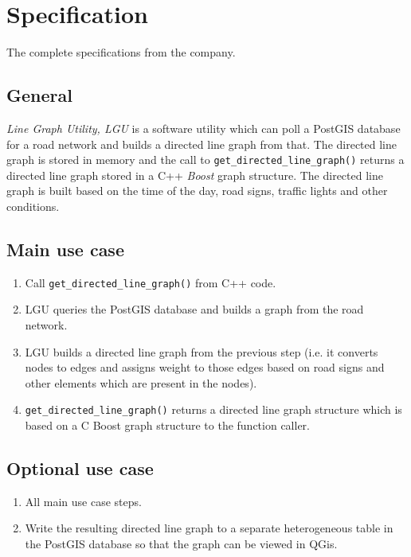 \documentclass[../main.tex]{subfiles}
\begin{document}
\chapter{Specification}\label{appendix-specification}
The complete specifications from the company.

\section{General}
\textit{Line Graph Utility, LGU} is a software utility which can poll a PostGIS database for a road network and builds a directed line graph from that. The directed line graph is stored in memory and the call to \texttt{get\_directed\_line\_graph()} returns a directed line graph stored in a C++ \textit{Boost} graph structure. The directed line graph is built based on the time of the day, road signs, traffic lights and other conditions.

\section{Main use case}
\begin{enumerate}[\thesection .1]
    \item Call \texttt{get\_directed\_line\_graph()} from C++ code.
    \item LGU queries the PostGIS database and builds a graph from the road network.
    \item LGU builds a directed line graph from the previous step (i.e. it converts nodes to edges and assigns weight to those edges based on road signs and other elements which are present in the nodes).
    \item \texttt{get\_directed\_line\_graph()} returns a directed line graph structure which is based on a C Boost graph structure to the function caller.
\end{enumerate}

\section{Optional use case}
\begin{enumerate}[\thesection .1]
    \item All main use case steps.
    \item Write the resulting directed line graph to a separate heterogeneous table in the PostGIS database so that the graph can be viewed in QGis.
\end{enumerate}
\end{document}
